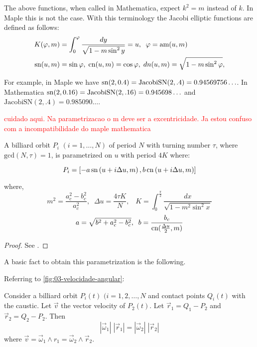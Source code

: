 \begin{remark} The above functions, when called in Mathematica, expect $ k^2 =m$  instead of $k$. In Maple this is not the case.
With this terminology the  Jacobi elliptic functions are defined    as follows:
\begin{align*}
K(\varphi,m)&=\int_0^{\varphi} \frac{dy}{\sqrt{1-m\sin^2y}}=u,\;\; \varphi=\text{am}(u,m)\\
\mathrm{sn}(u,m)&=\sin\varphi,\; \mathrm{cn}(u,m)=\cos\varphi,\; dn(u,m)=\sqrt{1-m\sin^2\varphi}, \end{align*}


For example, in Maple we have $\mathrm{sn}(2,0.4)=\text{JacobiSN}(2,.4)=0.94569756\ldots$. In    Mathematica   $\mathrm{sn}(2,0.16)=\text{JacobiSN}(2,.16)=0.945698 \ldots$  and $\text{JacobiSN}(2,.4)=0.985090\ldots$.
\end{remark}


 \textcolor{red}{cuidado aqui. Na parametrizacao o m deve ser a excentricidade. Ja estou confuso com a incompatibilidade do maple mathematica}
 
\begin{theorem}
A billiard orbit $P_i$ $(i=1,\ldots, N) $ of period $N$  with turning number $\tau$, where $\mathrm{gcd}(N,\tau) =1$,  is parametrized on $u$ with period $4K$ where:


\[ 
P_i=
\left[-a\,\mathrm{sn}  \left(u+ i \Delta{u},  {m} \right) , b\,\mathrm{cn}  \left(u + i \Delta{u}, { m} \right)\right]
\]

where,
\[ m^2=\frac{a_c^2-b_c^2}{a_c^2},\;\;\Delta{u}=\frac{4\tau K}{N},\;\;\;K=\int_{0}^{\frac{\pi}{2}} \frac {dx}{\sqrt {1-m^2\sin^2 x}} \]
\[a= \sqrt{b^2+ a_c^2-b_c^2}, \;\; b=\frac{b_c}{\mathrm{cn}(\frac{\Delta{u}}{2}, m)}\]
\end{theorem}
\begin{proof} See \cite{stachel2021-billiards}.\end{proof}

A basic fact to obtain this parametrization is the following.

Referring to \cref{fig:03-velocidade-angular}:

\begin{proposition} 
Consider a billiard orbit $P_i(t)$ $(i=1,2,\ldots, N$ and contact points $Q_i(t)$ with the caustic. Let $\vec v$ the vector velocity of $P_2(t)$. Let $\vec r_1=Q_1-P_2$ and $\vec r_2=Q_2-P_2$. Then
\[ |\vec \omega_1|\;|\vec r_1|=|\vec \omega_2|\; |\vec r_2|\]
where $\vec v=\vec\omega_1\wedge r_1= \vec\omega_2\wedge \vec r_2$.

\label{fig:03-velocidade-angular}
\end{proposition}

